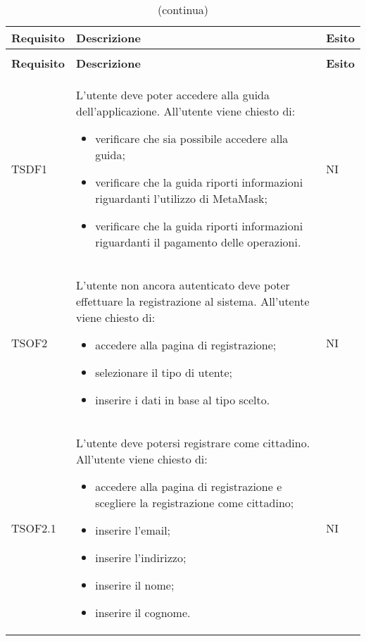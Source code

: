 	\begin{longtable}{ >{\centering}p{} >{\centering}p{}
			>{\centering}p{}}%
			
		\caption{Riepilogo Test di Accettazione}\\	
		\rowcolorhead
		\textbf{\color{white}Requisito} 
		& \textbf{\color{white}Descrizione} 
		& \centering\textbf{\color{white}Esito}
		\tabularnewline %
		\endfirsthead	
		
		\rowcolor{white}\caption[]{(continua)}\\	
		\rowcolorhead
		\textbf{\color{white}Requisito} 
		& \textbf{\color{white}Descrizione} 
		& \centering\textbf{\color{white}Esito}
		\tabularnewline %
		\endhead	
		
		 TSDF1	&	L'utente deve poter accedere alla guida dell'applicazione. All'utente viene
		chiesto di:
		\begin{itemize}
			\item verificare che sia possibile accedere alla guida;
			\item verificare che la guida riporti informazioni riguardanti l'utilizzo di
			MetaMask\glo{};
			\item verificare che la guida riporti informazioni riguardanti il pagamento
			delle operazioni. 
		\end{itemize}	&	NI
		\tabularnewline
		
		 TSOF2	&	L'utente non ancora autenticato deve poter effettuare la registrazione al
		sistema. All'utente viene chiesto di:
		\begin{itemize}
			\item accedere alla pagina di registrazione;
			\item selezionare il tipo di utente;
			\item inserire i dati in base al tipo scelto.
		\end{itemize}	&	NI
		\tabularnewline
		
		 TSOF2.1	&	L'utente deve potersi registrare come cittadino. All'utente viene chiesto di:
		\begin{itemize}
			\item accedere alla pagina di registrazione e scegliere la registrazione
			come cittadino;
			\item inserire l'email;
			\item inserire l'indirizzo;
			\item inserire il nome;
			\item inserire il cognome.
		\end{itemize}	&	NI
		\tabularnewline
		

\end{longtable}
